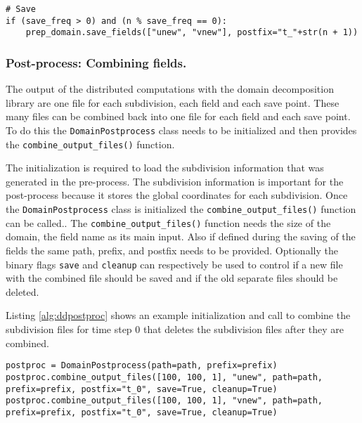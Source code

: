 \begin{lstlisting}[caption={Example calling to save two fields during time stepping using the domain decomposition libarary},captionpos=b, label={alg:ddsave}, float, floatplacement=H]
# Save
if (save_freq > 0) and (n % save_freq == 0):
    prep_domain.save_fields(["unew", "vnew"], postfix="t_"+str(n + 1))
\end{lstlisting}

\subsubsection{Post-process: Combining fields.}
The output of the distributed computations with the domain decomposition library are one file for each subdivision, each field and each save point.
These many files can be combined back into one file for each field and each save point.
To do this the \texttt{DomainPostprocess} class needs to be initialized and then provides the \texttt{combine\_output\_files()} function.

The initialization is required to load the subdivision information that was generated in the pre-process.
The subdivision information is important for the post-process because it stores the global coordinates for each subdivision.
Once the \texttt{DomainPostprocess} class is initialized the \texttt{combine\_output\_files()} function can be called..
The \texttt{combine\_output\_files()} function needs the size of the domain, the field name as its main input.
Also if defined during the saving of the fields the same path, prefix, and postfix needs to be provided.
Optionally the binary flags \texttt{save} and \texttt{cleanup} can respectively be used to control if a new file with the combined file should be saved and if the old separate files should be deleted.

Listing \ref{alg:ddpostproc} shows an example initialization and call to combine the subdivision files for time step 0 that deletes the subdivision files after they are combined.

\begin{lstlisting}[caption={Example post-processing.}, captionpos=b, label={alg:ddpostproc}, float, floatplacement=H]
postproc = DomainPostprocess(path=path, prefix=prefix)
postproc.combine_output_files([100, 100, 1], "unew", path=path, prefix=prefix, postfix="t_0", save=True, cleanup=True)
postproc.combine_output_files([100, 100, 1], "vnew", path=path, prefix=prefix, postfix="t_0", save=True, cleanup=True)
\end{lstlisting}

